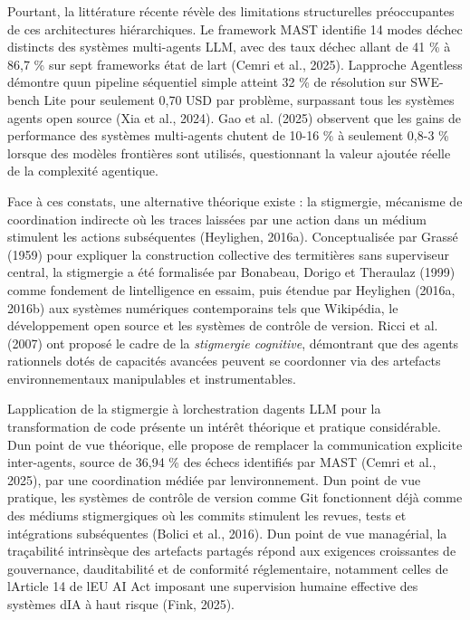 Pourtant, la littérature récente révèle des limitations structurelles
préoccupantes de ces architectures hiérarchiques. Le framework MAST
identifie 14 modes d\textquotesingle échec distincts des systèmes
multi-agents LLM, avec des taux d\textquotesingle échec allant de 41 \%
à 86,7 \% sur sept frameworks état de l\textquotesingle art (Cemri et
al., 2025). L\textquotesingle approche Agentless démontre
qu\textquotesingle un pipeline séquentiel simple atteint 32 \% de
résolution sur SWE-bench Lite pour seulement 0,70 USD par problème,
surpassant tous les systèmes agents open source (Xia et al., 2024). Gao
et al. (2025) observent que les gains de performance des systèmes
multi-agents chutent de 10-16 \% à seulement 0,8-3 \% lorsque des
modèles frontières sont utilisés, questionnant la valeur ajoutée réelle
de la complexité agentique.

Face à ces constats, une alternative théorique existe : la stigmergie,
mécanisme de coordination indirecte où les traces laissées par une
action dans un médium stimulent les actions subséquentes (Heylighen,
2016a). Conceptualisée par Grassé (1959) pour expliquer la construction
collective des termitières sans superviseur central, la stigmergie a été
formalisée par Bonabeau, Dorigo et Theraulaz (1999) comme fondement de
l\textquotesingle intelligence en essaim, puis étendue par Heylighen
(2016a, 2016b) aux systèmes numériques contemporains tels que Wikipédia,
le développement open source et les systèmes de contrôle de version.
Ricci et al. (2007) ont proposé le cadre de la \emph{stigmergie
cognitive}, démontrant que des agents rationnels dotés de capacités
avancées peuvent se coordonner via des artefacts environnementaux
manipulables et instrumentables.

L\textquotesingle application de la stigmergie à
l\textquotesingle orchestration d\textquotesingle agents LLM pour la
transformation de code présente un intérêt théorique et pratique
considérable. D\textquotesingle un point de vue théorique, elle propose
de remplacer la communication explicite inter-agents, source de 36,94 \%
des échecs identifiés par MAST (Cemri et al., 2025), par une
coordination médiée par l\textquotesingle environnement.
D\textquotesingle un point de vue pratique, les systèmes de contrôle de
version comme Git fonctionnent déjà comme des médiums stigmergiques où
les commits stimulent les revues, tests et intégrations subséquentes
(Bolici et al., 2016). D\textquotesingle un point de vue managérial, la
traçabilité intrinsèque des artefacts partagés répond aux exigences
croissantes de gouvernance, d\textquotesingle auditabilité et de
conformité réglementaire, notamment celles de l\textquotesingle Article
14 de l\textquotesingle EU AI Act imposant une supervision humaine
effective des systèmes d\textquotesingle IA à haut risque (Fink, 2025).

